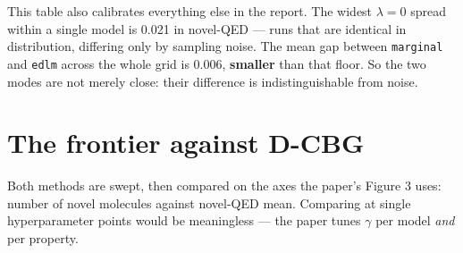 \documentclass[11pt]{article}
\begin{document}
This table also calibrates everything else in the report. The widest $\lambda=0$
spread within a single model is 0.021 in novel-QED --- runs that are
identical in distribution, differing only by sampling noise. The mean gap between
\texttt{marginal} and \texttt{edlm} across the whole grid is 0.006,
\textbf{smaller} than that floor. So the two
modes are not merely close: their difference is
indistinguishable from noise.

\section{The frontier against D-CBG}

Both methods are swept, then compared on the axes the paper's Figure 3 uses:
number of novel molecules against novel-QED mean. Comparing at single
hyperparameter points would be meaningless --- the paper tunes $\gamma$ per model
\emph{and} per property.

\begin{table}[htbp]
\centering
\small
{}
\caption{MDLM: the Pareto-optimal settings of each method on (novel count, novel-QED).}
\label{tab:frontier-qed-MDLM}
\end{table}
\end{document}
